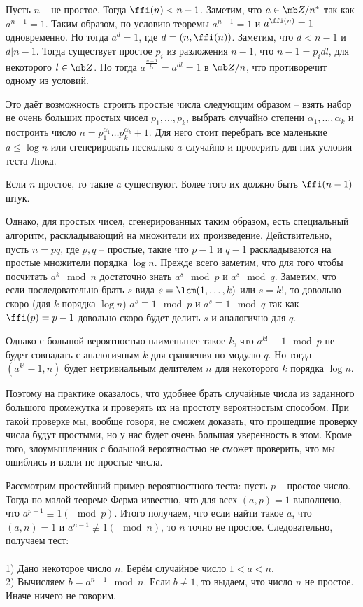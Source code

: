 Пусть $n$ -- не простое. Тогда $\ffi(n)<n-1$. Заметим, что $a\in \mb Z/n^*$ так как $a^{n-1} = 1$. Таким образом, по условию теоремы $a^{n-1}= 1$  и $a^{\ffi(n)}=1$  одновременно. Но тогда $a^d=1$, где $d=(n,\ffi(n))$. Заметим, что $d<n-1$  и $d|n-1$. Тогда существует простое $p_i$ из разложения $n-1$, что $n-1=p_idl$, для некоторого $l\in \mb Z$. Но тогда $a^{\frac{n-1}{p_i}}=a^{dl}=1$ в $\mb Z/n$, что противоречит одному из условий.
\endproof

Это даёт возможность строить простые числа следующим образом -- взять набор не очень больших простых чисел $p_1,\dots,p_k$, выбрать случайно степени $\alpha_1,\dots,\alpha_k$ и построить число $n=p_1^{\alpha_1}\dots p_k^{\alpha_k}+1$. Для него стоит перебрать все маленькие $a \leq \log n$ или сгенерировать несколько $a$ случайно и проверить для них  условия теста Люка. 

 Если $n$ простое, то такие $a$ существуют. Более того их должно быть $\ffi(n-1)$ штук. 
\efct

Однако, для  простых чисел,  сгенерированных таким образом, есть специальный алгоритм, раскладывающий на множители их произведение. Действительно, пусть $n=pq$, где $p,q$ -- простые, такие что $p-1$ и $q-1$ раскладываются на простые множители порядка $\log n$. Прежде всего заметим, что для того чтобы посчитать $a^k 
\mod n$ достаточно знать $a^s \mod p$  и $a^s \mod q$. Заметим, что если последовательно брать $s$ вида $s=\lcm(1,\dots,k)$ или $s=k!$, то довольно скоро (для $k$ порядка $\log n$)  $a^s\equiv 1 \mod p$ и $a^s \equiv 1 \mod q$ так как $\ffi(p)=p-1$ довольно скоро будет делить $s$ и аналогично для $q$. 

Однако с большой вероятностью наименьшее такое $k$, что $a^{k!}\equiv 1 \mod p$ не будет совпадать с аналогичным $k$ для сравнения по модулю $q$. Но тогда $(a^{k!}-1,n)$ будет нетривиальным делителем $n$ для некоторого $k$ порядка $\log n$.

Поэтому на практике оказалось, что удобнее брать случайные числа из заданного большого промежутка и проверять их на простоту вероятностым способом. При такой проверке мы, вообще говоря, не сможем доказать, что прошедшие проверку числа будут простыми, но у нас будет очень большая уверенность в этом. Кроме того,  злоумышленник с большой вероятностью не сможет проверить, что мы ошиблись и взяли не простые числа.

Рассмотрим простейший пример вероятностного теста: пусть $p$ -- простое число. Тогда по малой теореме Ферма известно, что для всех $(a,p)=1$ выполнено, что $a^{p-1}\equiv 1(\mod p)$. Итого получаем, что если найти такое $a$, что $(a,n)=1$ и $a^{n-1}\nequiv 1(\mod n)$, то $n$ точно не простое. Следовательно, получаем  тест:\\
\\
1) Дано некоторое число $n$. Берём случайное число $1<a<n$.\\
2) Вычисляем $b=a^{n-1} \mod n$. Если $b\neq 1$, то выдаем, что число $n$ не простое. Иначе ничего не говорим.

